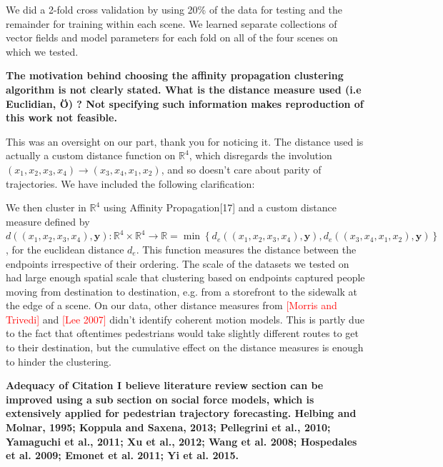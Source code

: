 \documentclass[usenames,dvipsnames]{article}
\newcommand{\todo}[1]{\textcolor{red}{#1}}
\providecommand{\response}[1]{
\noindent
\noindent\colorbox{gray!20}{
\parbox{\textwidth}{
\setlength{\parskip}{.1in}
\setlength{\parindent}{.1in}
#1}
}
}
\begin{document}
\begin{enumerate}
\response{We did a 2-fold cross validation by using 20\% of the data for testing and the remainder for training within each scene. We learned separate collections of vector fields and model parameters for each fold on all of the four scenes on which we tested.}


\begin{item}
\textbf{The motivation behind choosing the affinity propagation clustering
algorithm is not clearly stated. 
What is the distance measure used (i.e Euclidian, \"{O}) ? Not specifying
such information makes reproduction of this work not feasible. }

This was an oversight on our part, thank you for noticing it. The distance used is actually a custom distance function on $\mathbb{R}^4$, which disregards the involution $(x_1, x_2, x_3, x_4) \to (x_3, x_4, x_1, x_2)$, and so doesn't care about parity of trajectories. We have included the following clarification:

\response{We then cluster in $\mathbb{R}^4$ using Affinity Propagation[17] and a custom distance measure defined by $d((x_1, x_2, x_3, x_4),\mathbf{y}) : \mathbb{R}^4 \times \mathbb{R}^4 \to \mathbb{R} = \min \left\{ d_e((x_1, x_2, x_3, x_4), \mathbf{y}), d_e((x_3, x_4, x_1, x_2), \mathbf{y}) \right\}$, for the euclidean distance $d_e$. This function measures the distance between the endpoints irrespective of their ordering. The scale of the datasets we tested on had large enough spatial scale that clustering based on endpoints captured people moving from destination to destination, e.g. from a storefront to the sidewalk at the edge of a scene. On our data, other distance measures from \todo{[Morris and Trivedi]} and \todo{[Lee 2007]} didn't identify coherent motion models. This is partly due to the fact that oftentimes pedestrians would take slightly different routes to get to their destination, but the cumulative effect on the distance measures is enough to hinder the clustering. }
	
\end{item}

\begin{item}
\textbf{Adequacy of Citation
I believe literature review section can be improved using a sub section
on social force models, which is extensively applied for pedestrian
trajectory forecasting. 
Helbing and Molnar, 1995; Koppula and Saxena, 2013; Pellegrini et al.,
2010; Yamaguchi et al., 2011; Xu et al., 2012; Wang et al. 2008;
Hospedales et al. 2009; Emonet et al. 2011; Yi et al. 2015.}
\end{item}


\end{enumerate}
\end{document}
